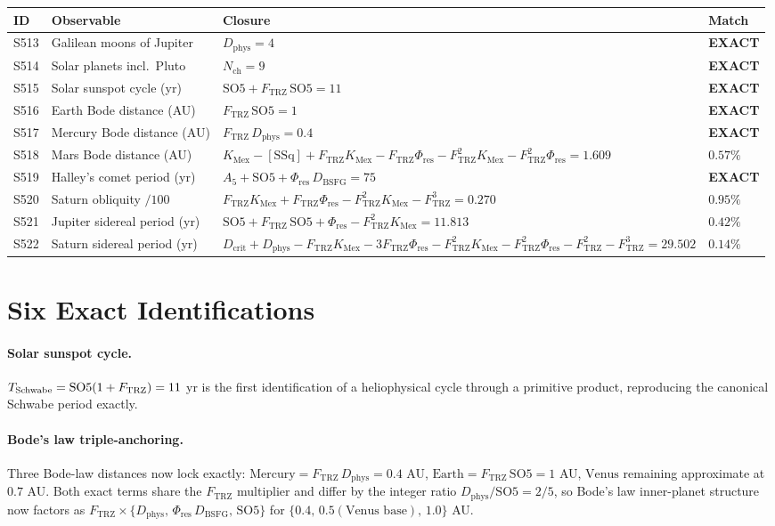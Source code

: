 \documentclass[11pt]{article}
\newcommand{\Ftrz}{F_{\mathrm{TRZ}}}
\newcommand{\Phires}{\Phi_{\mathrm{res}}}
\newcommand{\KMex}{K_{\mathrm{Mex}}}
\newcommand{\Dphys}{D_{\mathrm{phys}}}
\newcommand{\Dbsfg}{D_{\mathrm{BSFG}}}
\newcommand{\Dcrit}{D_{\mathrm{crit}}}
\newcommand{\Nch}{N_{\mathrm{ch}}}
\newcommand{\SOfive}{\mathrm{SO5}}
\newcommand{\Afive}{A_{5}}
\newcommand{\SSq}{[\mathrm{SSq}]}
\begin{document}
\begin{longtable}{@{}llll@{}}
\toprule
ID & Observable & Closure & Match \\
\midrule
\endhead
S513 & Galilean moons of Jupiter & $\Dphys = 4$ & \textbf{EXACT} \\
S514 & Solar planets incl.\ Pluto & $\Nch = 9$ & \textbf{EXACT} \\
S515 & Solar sunspot cycle (yr) & $\SOfive+\Ftrz\,\SOfive = 11$ & \textbf{EXACT} \\
S516 & Earth Bode distance (AU) & $\Ftrz\,\SOfive = 1$ & \textbf{EXACT} \\
S517 & Mercury Bode distance (AU) & $\Ftrz\,\Dphys = 0.4$ & \textbf{EXACT} \\
S518 & Mars Bode distance (AU) & $\KMex-\SSq+\Ftrz\KMex-\Ftrz\Phires-\Ftrz^2\KMex-\Ftrz^2\Phires=1.609$ & $0.57\%$ \\
S519 & Halley's comet period (yr) & $\Afive+\SOfive+\Phires\,\Dbsfg = 75$ & \textbf{EXACT} \\
S520 & Saturn obliquity $/100$ & $\Ftrz\KMex+\Ftrz\Phires-\Ftrz^2\KMex-\Ftrz^3=0.270$ & $0.95\%$ \\
S521 & Jupiter sidereal period (yr) & $\SOfive+\Ftrz\,\SOfive+\Phires-\Ftrz^2\KMex=11.813$ & $0.42\%$ \\
S522 & Saturn sidereal period (yr) & $\Dcrit+\Dphys-\Ftrz\KMex-3\Ftrz\Phires-\Ftrz^2\KMex-\Ftrz^2\Phires-\Ftrz^2-\Ftrz^3=29.502$ & $0.14\%$ \\
\bottomrule
\end{longtable}

\section{Six Exact Identifications}

\paragraph{Solar sunspot cycle.}
$T_{\rm Schwabe} = \SOfive(1+\Ftrz) = 11$ yr is the first identification of
a heliophysical cycle through a primitive product, reproducing the canonical
Schwabe period exactly.

\paragraph{Bode's law triple-anchoring.}
Three Bode-law distances now lock exactly:
$\mathrm{Mercury} = \Ftrz\,\Dphys = 0.4$ AU,
$\mathrm{Earth} = \Ftrz\,\SOfive = 1$ AU,
$\mathrm{Venus}$ remaining approximate at $0.7$ AU.
Both exact terms share the $\Ftrz$ multiplier and differ by the integer ratio
$\Dphys/\SOfive = 2/5$, so Bode's law inner-planet structure now factors as
$\Ftrz \times \{\Dphys,\,\Phires\,\Dbsfg,\,\SOfive\}$ for
$\{0.4,\,0.5(\text{Venus base}),\,1.0\}$ AU.
\end{document}
